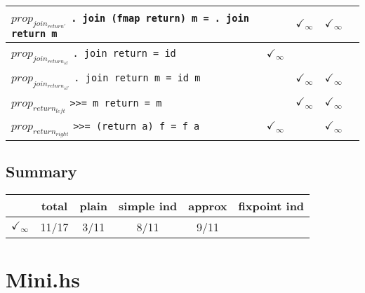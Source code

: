 \documentclass{article}
\begin{document}
\begin{longtable}{p{10cm} || c | c | c | c | }
\hline
$prop_{join_{return'}}$ \newline \verb`. join (fmap return) m = . join return m` &  & $\checkmark_{\infty}$ & $\checkmark_{\infty}$ &  \\
\hline
$prop_{join_{return_{id}}}$ \newline \verb`. join return = id` & $\checkmark_{\infty}$ &  &  &  \\
\hline
$prop_{join_{return_{id'}}}$ \newline \verb`. join return m = id m` &  & $\checkmark_{\infty}$ & $\checkmark_{\infty}$ &  \\
\hline
$prop_{return_{left}}$ \newline \verb`>>= m return = m` &  & $\checkmark_{\infty}$ & $\checkmark_{\infty}$ &  \\
\hline
$prop_{return_{right}}$ \newline \verb`>>= (return a) f = f a` & $\checkmark_{\infty}$ &  & $\checkmark_{\infty}$ &  \\
\end{longtable}

\subsection*{Summary}
\begin{longtable}{p{4cm} || c | c | c | c | c | }
  & total & plain & simple ind & approx & fixpoint ind \\
\hline
$\checkmark_{\infty}$ & 11/17 & 3/11 & 8/11 & 9/11 & \\
\end{longtable}

\section*{Mini.hs}
\end{document}
